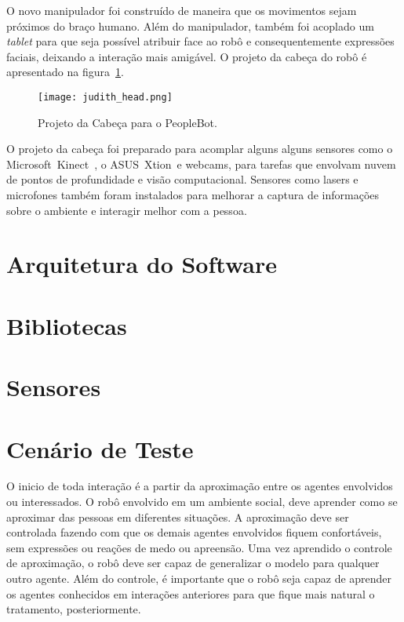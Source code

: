 O novo manipulador foi construído de maneira que os movimentos sejam próximos do braço humano. Além do manipulador, também foi acoplado um \emph{tablet} para que seja possível atribuir face ao robô e consequentemente expressões faciais, deixando a interação mais amigável. O projeto da cabeça do robô é apresentado na figura~\ref{fig:judithhead}.

\begin{figure}[ht!]
	\centering
	\begin{minipage}{0.4\textwidth}
		\caption{Projeto da Cabeça para o PeopleBot.}
		\texttt{[image: judith\_head.png]}
		\label{fig:judithhead}
	\end{minipage}
\end{figure}

O projeto da cabeça foi preparado para acomplar alguns alguns sensores como o Microsoft\textregistered\ Kinect\textregistered\ , o ASUS\textregistered\ Xtion\textregistered\ e webcams, para tarefas que envolvam nuvem de pontos de profundidade e visão computacional. Sensores como lasers e microfones também foram instalados para melhorar a captura de informações sobre o ambiente e interagir melhor com a pessoa.

\section{Arquitetura do Software}
\label{sec:arquitetura}

\section{Bibliotecas}
\label{sec:bibliotecas}

\section{Sensores}
\label{sec:sensores}

\section{Cenário de Teste} %
\label{sec:cenario}
O inicio de toda interação é a partir da aproximação entre os agentes envolvidos ou interessados. O robô envolvido em um ambiente social, deve aprender como se aproximar das pessoas em diferentes situações. A aproximação deve ser controlada fazendo com que os demais agentes envolvidos fiquem confortáveis, sem expressões ou reações de medo ou apreensão. Uma vez aprendido o controle de aproximação, o robô deve ser capaz de generalizar o modelo para qualquer outro agente. Além do controle, é importante que o robô seja capaz de aprender os agentes conhecidos em interações anteriores para que fique mais natural o tratamento, posteriormente.


